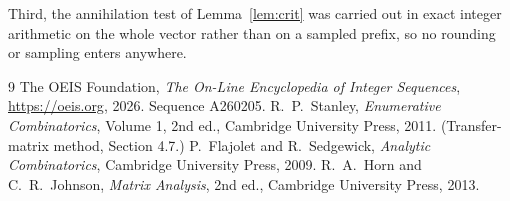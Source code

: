 \documentclass[11pt,a4paper]{article}
\theoremstyle{plain}
\theoremstyle{definition}
\begin{document}
Third, the annihilation test of Lemma~\ref{lem:crit} was carried out in exact integer
arithmetic on the whole vector rather than on a sampled prefix, so no rounding or sampling
enters anywhere.

\begin{thebibliography}{9}
 The OEIS Foundation, \emph{The On-Line Encyclopedia of Integer
Sequences}, \url{https://oeis.org}, 2026. Sequence A260205.
 R.~P.~Stanley, \emph{Enumerative Combinatorics}, Volume 1, 2nd ed.,
Cambridge University Press, 2011. (Transfer-matrix method, Section 4.7.)
 P.~Flajolet and R.~Sedgewick, \emph{Analytic Combinatorics}, Cambridge
University Press, 2009.
 R.~A.~Horn and C.~R.~Johnson, \emph{Matrix Analysis}, 2nd ed., Cambridge
University Press, 2013.
\end{thebibliography}
\end{document}
